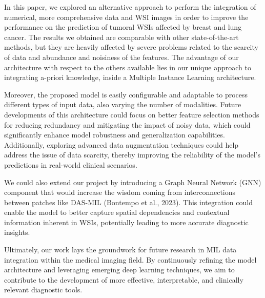 \documentclass[10pt,twocolumn]{article}
\begin{document}




In this paper, we explored an alternative approach to perform the integration of numerical, more comprehensive data and WSI images in order to improve the performance on the prediction of tumoral WSIs affected by breast and lung cancer. The results we obtained are comparable with other state-of-the-art methods, but they are heavily affected by severe problems related to the scarcity of data and abundance and noisiness of the features. The advantage of our architecture with respect to the others available lies in our unique approach to integrating a-priori knowledge, inside a Multiple Instance Learning architecture.

Moreover, the proposed model is easily configurable and adaptable to process different types of input data, also varying the number of modalities. Future developments of this architecture could focus on better feature selection methods for reducing redundancy and mitigating the impact of noisy data, which could significantly enhance model robustness and generalization capabilities. Additionally, exploring advanced data augmentation techniques could help address the issue of data scarcity, thereby improving the reliability of the model's predictions in real-world clinical scenarios.

We could also extend our project by introducing a Graph Neural Network (GNN) component that would increase the wisdom coming from interconnections between patches like DAS-MIL (Bontempo et al., 2023)\cite{10.1007/978-3-031-43907-0_24}. This integration could enable the model to better capture spatial dependencies and contextual information inherent in WSIs, potentially leading to more accurate diagnostic insights. 

Ultimately, our work lays the groundwork for future research in MIL data integration within the medical imaging field. By continuously refining the model architecture and leveraging emerging deep learning techniques, we aim to contribute to the development of more effective, interpretable, and clinically relevant diagnostic tools.




\end{document}
